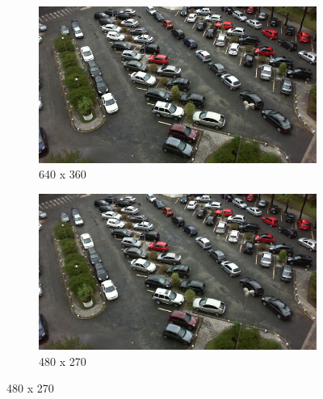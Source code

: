 \begin{figure}[H]
    \bigskip
    \begin{subfigure}{.5\textwidth}
        \centering
        \includegraphics[width=.85\linewidth]{img/conception/image_process/downsample_only/3.png}
        \caption{640 x 360}
    \end{subfigure}%
    \begin{subfigure}{.5\textwidth}
        \centering
        \includegraphics[width=.85\linewidth]{img/conception/image_process/downsample_only/2.png}
        \caption{480 x 270}
    \end{subfigure}%
    

\end{figure}
